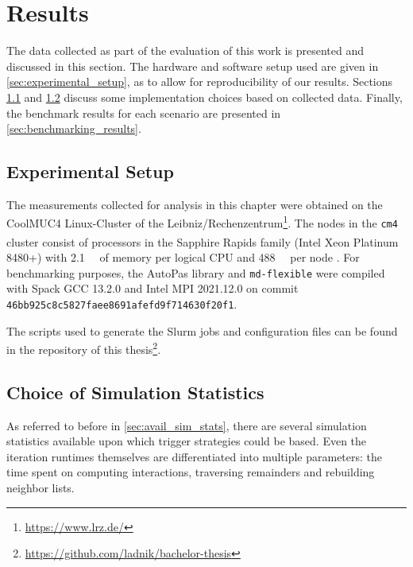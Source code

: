 \chapter[Results]{Results}
\label{cp:results}

{
	\parindent0pt
	The data collected as part of the evaluation of this work is presented and discussed in this section. The hardware and software setup used are given in \autoref{sec:experimental_setup}, as to allow for reproducibility of our results. Sections \ref{sec:experimental_setup} and \ref{sec:justification_rebuild} discuss some implementation choices based on collected data. Finally, the benchmark results for each scenario are presented in \autoref{sec:benchmarking_results}.
}


\section{Experimental Setup}
\label{sec:experimental_setup}
The measurements collected for analysis in this chapter were obtained on the CoolMUC4 Linux-Cluster of the Leibniz\-/Rechenzentrum\footnote{\href{https://www.lrz.de/}{https://www.lrz.de/}}. The nodes in the \texttt{cm4} cluster consist of processors in the Sapphire Rapids family (Intel\textsuperscript{\textregistered} Xeon\textsuperscript{\textregistered} Platinum 8480+)  with \qty{2.1}{\gibi \byte} of memory per logical CPU and \qty{488}{\gibi \byte} per node \cite{LSC2025}. For benchmarking purposes, the AutoPas library and \texttt{md-flexible} were compiled with  Spack GCC 13.2.0 and Intel MPI 2021.12.0 on commit \texttt{46bb925c8c5827faee8691afefd9f714630f20f1}.

The scripts used to generate the Slurm jobs and configuration files can be found in the repository of this thesis\footnote{\href{https://github.com/ladnik/bachelor-thesis}{https://github.com/ladnik/bachelor-thesis}}.


\section{Choice of Simulation Statistics}
\label{sec:justification_rebuild}
As referred to before in \autoref{sec:avail_sim_stats}, there are several simulation statistics available upon which trigger strategies could be based. Even the iteration runtimes themselves are differentiated into multiple parameters: the time spent on computing interactions, traversing remainders and rebuilding neighbor lists.

